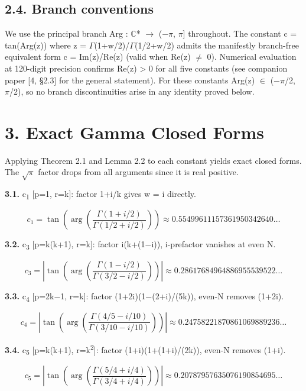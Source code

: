 \documentclass[11pt]{article}
\begin{document}
\hypertarget{branch-conventions}{%
\subsection{2.4. Branch conventions}\label{branch-conventions}}

We use the principal branch Arg : \(\mathbb{C}\)* \(\to\) (−\(\pi\),
\(\pi\){]} throughout. The constant c = \textbar tan(Arg(z))\textbar{}
where z = \(\Gamma\)(1+w/2)/\(\Gamma\)(1/2+w/2) admits the manifestly
branch-free equivalent form c = \textbar Im(z)/Re(z)\textbar{} (valid
when Re(z) \(\neq\) 0). Numerical evaluation at 120-digit precision
confirms Re(z) \textgreater{} 0 for all five constants (see companion
paper {[}4, §2.3{]} for the general statement). For these constants
Arg(z) \(\in\) (−\(\pi\)/2, \(\pi\)/2), so no branch discontinuities
arise in any identity proved below.

\hypertarget{exact-gamma-closed-forms}{%
\section{3. Exact Gamma Closed Forms}\label{exact-gamma-closed-forms}}

Applying Theorem 2.1 and Lemma 2.2 to each constant yields exact closed
forms. The \(\sqrt{\pi}\) factor drops from all arguments since it is
real positive.

\textbf{3.1.} c\textsubscript{1} {[}p=1, r=k{]}: factor 1+i/k gives w =
i directly.

\[c_1 = \tan\!\left(\arg\!\left(\frac{\Gamma(1+i/2)}{\Gamma(1/2+i/2)}\right)\right) \approx 0.55499611157361950342640\ldots\]

\textbf{3.2.} c\textsubscript{3} {[}p=k(k+1), r=k{]}: factor i(k+(1−i)),
i-prefactor vanishes at even N.

\[c_3 = \left|\tan\!\left(\arg\!\left(\frac{\Gamma(1-i/2)}{\Gamma(3/2-i/2)}\right)\right)\right| \approx 0.28617684964886955539522\ldots\]

\textbf{3.3.} c\textsubscript{4} {[}p=2k−1, r=k{]}: factor
(1+2i)(1−(2+i)/(5k)), even-N removes (1+2i).

\[c_4 = \left|\tan\!\left(\arg\!\left(\frac{\Gamma(4/5-i/10)}{\Gamma(3/10-i/10)}\right)\right)\right| \approx 0.24758221870861069889236\ldots\]

\textbf{3.4.} c\textsubscript{5} {[}p=k(k+1), r=k\textsuperscript{2}{]}:
factor (1+i)(1+(1+i)/(2k)), even-N removes (1+i).

\[c_5 = \left|\tan\!\left(\arg\!\left(\frac{\Gamma(5/4+i/4)}{\Gamma(3/4+i/4)}\right)\right)\right| \approx 0.20787957635076190854695\ldots\]
\end{document}
